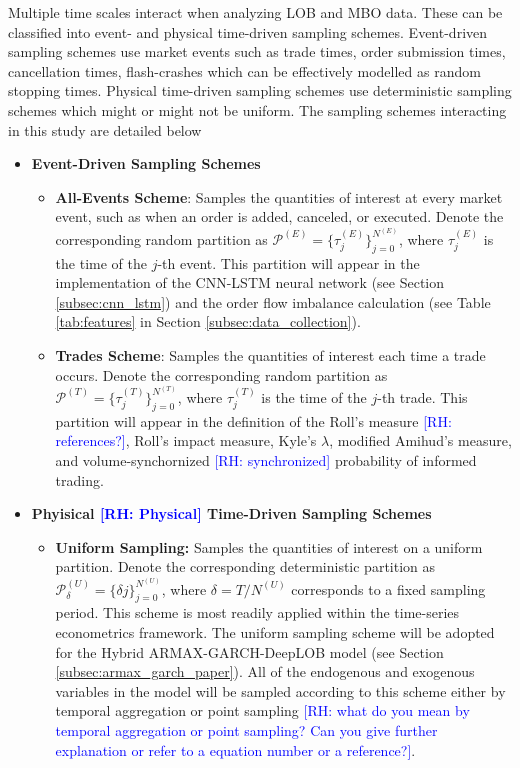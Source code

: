 \documentclass[10pt,a4paper,oneside]{article}
\newcommand{\rh}[1]{\textcolor{blue}{\textsf{[RH: #1]}}}
\begin{document}
Multiple time scales interact when analyzing LOB and MBO data. These can be classified into event- and physical time-driven sampling schemes. Event-driven sampling schemes use market events such as trade times, order submission times, cancellation times, flash-crashes which can be effectively modelled as random stopping times. Physical time-driven sampling schemes use deterministic sampling schemes which might or might not be uniform. The sampling schemes interacting in this study are detailed below 

\begin{itemize}
    \item \textbf{Event-Driven Sampling Schemes}
          \begin{itemize}
              \item \textbf{All-Events Scheme}: Samples the quantities of interest at every market event, such as when an order is added, canceled, or executed. Denote the corresponding random partition as $\mathcal{P}^{(E)} = \{\tau^{(E)}_j\}_{j=0}^{N^{(E)}}$, where $\tau^{(E)}_j$ is the time of the $j$-th event. This partition will appear in the implementation of the CNN-LSTM neural network (see Section \ref{subsec:cnn_lstm}) and the order flow imbalance calculation (see Table \ref{tab:features} in Section \ref{subsec:data_collection}).
              \item \textbf{Trades Scheme}: Samples the quantities of interest each time a trade occurs. Denote the corresponding random partition as $\mathcal{P}^{(T)} = \{\tau^{(T)}_j\}_{j=0}^{N^{(T)}}$, where $\tau^{(T)}_j$ is the time of the $j$-th trade. This partition will appear in the definition of the Roll's measure \rh{references?}, Roll's impact measure, Kyle's $\lambda$, modified  Amihud's measure, and volume-synchornized  \rh{synchronized} probability of informed trading.
          \end{itemize}
    \item \textbf{Phyisical \rh{Physical} Time-Driven Sampling Schemes}
          \begin{itemize}
              \item \textbf{Uniform Sampling:} Samples the quantities of interest on a uniform partition. Denote the corresponding deterministic partition as $\mathcal{P}^{(U)}_{\delta} = \{\delta j\}_{j=0}^{N^{(U)}}$, where $\delta = T / N^{(U)}$ corresponds to a fixed sampling period. This scheme is most readily applied within the time-series econometrics framework. The uniform sampling scheme will be adopted for the Hybrid ARMAX-GARCH-DeepLOB model (see Section \ref{subsec:armax_garch_paper}). All of the endogenous and exogenous variables in the model will be sampled according to this scheme either by temporal aggregation or point sampling \rh{what do you mean by temporal aggregation or point sampling? Can you give further explanation or refer to a equation number or a reference?}.
          \end{itemize}
\end{itemize}
\end{document}
